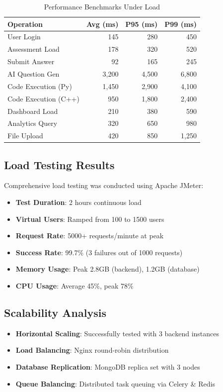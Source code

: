 \documentclass[conference]{IEEEtran}
\begin{document}
\begin{table}[ht]
    \centering
    \caption{Performance Benchmarks Under Load}
    \label{tab:benchmarks}
    \begin{tabular}{@{}lrrr@{}}
        \toprule
        \textbf{Operation} & \textbf{Avg (ms)} & \textbf{P95 (ms)} & \textbf{P99 (ms)} \\
        \midrule
        User Login & 145 & 280 & 450 \\
        Assessment Load & 178 & 320 & 520 \\
        Submit Answer & 92 & 165 & 245 \\
        AI Question Gen & 3,200 & 4,500 & 6,800 \\
        Code Execution (Py) & 1,450 & 2,900 & 4,100 \\
        Code Execution (C++) & 950 & 1,800 & 2,400 \\
        Dashboard Load & 210 & 380 & 590 \\
        Analytics Query & 320 & 650 & 980 \\
        File Upload & 420 & 850 & 1,250 \\
        \bottomrule
    \end{tabular}
\end{table}

\subsection{Load Testing Results}
Comprehensive load testing was conducted using Apache JMeter:
\begin{itemize}
    \item \textbf{Test Duration}: 2 hours continuous load
    \item \textbf{Virtual Users}: Ramped from 100 to 1500 users
    \item \textbf{Request Rate}: 5000+ requests/minute at peak
    \item \textbf{Success Rate}: 99.7\% (3 failures out of 1000 requests)
    \item \textbf{Memory Usage}: Peak 2.8GB (backend), 1.2GB (database)
    \item \textbf{CPU Usage}: Average 45\%, peak 78\%
\end{itemize}

\subsection{Scalability Analysis}
\begin{itemize}
    \item \textbf{Horizontal Scaling}: Successfully tested with 3 backend instances
    \item \textbf{Load Balancing}: Nginx round-robin distribution
    \item \textbf{Database Replication}: MongoDB replica set with 3 nodes
    \item \textbf{Queue Balancing}: Distributed task queuing via Celery & Redis
\end{itemize}
\end{document}
